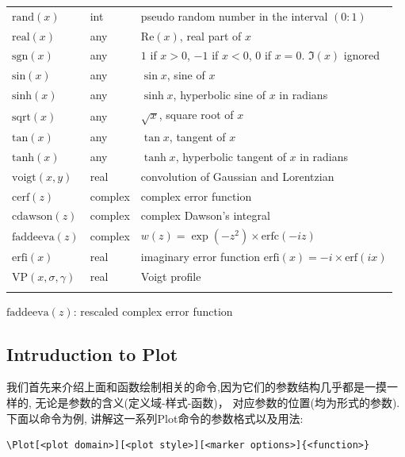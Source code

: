 \begin{center}
\begin{longtable}{lll}
        \(\text{rand}(x)\) & int & pseudo random number in the interval $(0:1)$ \\
        \(\text{real}(x)\) & any & $\text{Re}(x)$, real part of $x$ \\
        \(\text{sgn}(x)\) & any & $1$ if $x > 0$, $-1$ if $x < 0$, $0$ if $x = 0$. $\Im(x)$ ignored \\
        \(\text{sin}(x)\) & any & $\sin x$, sine of $x$ \\
        \(\text{sinh}(x)\) & any & $\sinh x$, hyperbolic sine of $x$ in radians \\
        \(\text{sqrt}(x)\) & any & $\sqrt{x}$, square root of $x$ \\
        \(\text{tan}(x)\) & any & $\tan x$, tangent of $x$ \\
        \(\text{tanh}(x)\) & any & $\tanh x$, hyperbolic tangent of $x$ in radians \\
        \(\text{voigt}(x,y)\) & real & convolution of Gaussian and Lorentzian \\
        \(\text{cerf}(z)\) & complex & complex error function \\
        \(\text{cdawson}(z)\) & complex & complex Dawson's integral \\
        \(\text{faddeeva}(z)\) & complex & $w(z) = \exp(-z^2) \times \text{erfc}(-iz)$ \\
        \(\text{erfi}(x)\) & real & imaginary error function $\text{erfi}(x) = -i \times \text{erf}(ix)$ \\
        \(\text{VP}(x,\sigma,\gamma)\) & real & Voigt profile \\
        \bottomrule 
        \label{tab:gnuplot-functions}\\
    \end{longtable}
\end{center}
\vspace*{-4em}

\begin{remark}
    \(\text{faddeeva}(z)\): rescaled complex error function
\end{remark}

\subsection{Intruduction to Plot}
我们首先来介绍上面和函数绘制相关的命令,因为它们的参数结构几乎都是一摸一样的, 无论是参数的含义(定义域-样式-函数)，
对应参数的位置(均为形式的参数). 下面以\cmd{\Plot}命令为例, 讲解这一系列Plot命令的参数格式以及用法:
\begin{verbatim}
\Plot[<plot domain>][<plot style>][<marker options>]{<function>}
\end{verbatim}


